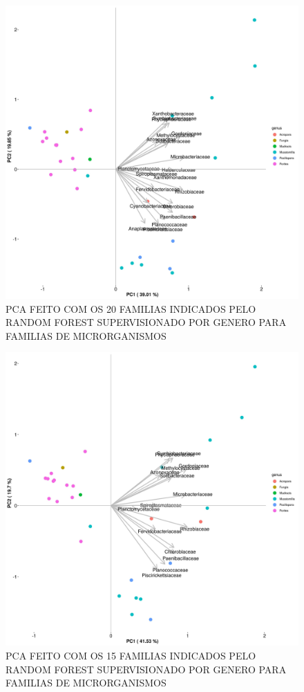 \documentclass[12pt, a4paper]{report}
\begin{document}
\begin{figure}[H]
\centering
\includegraphics[scale=0.3]{figures/familia/pca_corais_mg_rast_rf_supervisionado_genus_20_familias_23_10_2018.jpg}
\caption{PCA FEITO COM OS 20 FAMILIAS INDICADOS PELO RANDOM FOREST SUPERVISIONADO POR GENERO PARA FAMILIAS DE MICRORGANISMOS}
\label{fig:PCA20FAMILIASDERIVADODORFSUPERVISIONADOGENEROPFAMILIAS}
\end{figure}

\begin{figure}[H]
\centering
\includegraphics[scale=0.3]{figures/familia/pca_corais_mg_rast_rf_supervisionado_genus_15_familias_30_10_2018.jpg}
\caption{PCA FEITO COM OS 15 FAMILIAS INDICADOS PELO RANDOM FOREST SUPERVISIONADO POR GENERO PARA FAMILIAS DE MICRORGANISMOS}
\label{fig:PCA15FAMILIASDERIVADODORFSUPERVISIONADOGENEROPFAMILIAS}
\end{figure}
\end{document}
